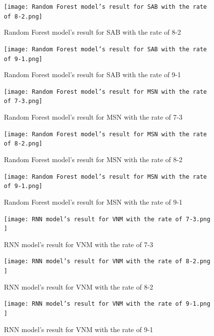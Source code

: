 \documentclass{ieeeojies}
\begin{document}
     \begin{figure}[H]
    \centering
    \begin{minipage}{0.23\textwidth}
    \centering
    \texttt{[image: Random Forest model’s result for SAB with the rate of 8-2.png]}
    \caption{Random Forest model’s result for SAB with the rate of 8-2}
    \end{minipage}
    \hfill
    \begin{minipage}{0.23\textwidth}
    \centering
    \texttt{[image: Random Forest model’s result for SAB with the rate of 9-1.png]}
    \caption{Random Forest model’s result for SAB with the rate of 9-1}
    \end{minipage}

    \begin{minipage}{0.23\textwidth}
    \centering
    \texttt{[image: Random Forest model’s result for MSN with the rate of 7-3.png]}
    \caption{Random Forest model’s result for MSN with the rate of 7-3}
    \end{minipage}
    \hfill
    \begin{minipage}{0.23\textwidth}
    \centering
    \texttt{[image: Random Forest model’s result for MSN with the rate of 8-2.png]}
    \caption{Random Forest model’s result for MSN with the rate of 8-2}
    \end{minipage}
   \end{figure}

    \begin{figure}[H]
    \centering
    \begin{minipage}{0.23\textwidth}
    \centering
    \texttt{[image: Random Forest model’s result for MSN with the rate of 9-1.png]}
    \caption{Random Forest model’s result for MSN with the rate of 9-1}
    \end{minipage}
    \begin{minipage}{0.23\textwidth}
    \centering
    \texttt{[image: RNN model’s result for VNM with the rate of 7-3.png ]}
    \caption{RNN model’s result for VNM with the rate of 7-3}
    \end{minipage}
    \end{figure}

    \begin{figure}[H]
    \begin{minipage}{0.23\textwidth}
    \centering
    \texttt{[image: RNN model’s result for VNM with the rate of 8-2.png ]}
    \caption{RNN model’s result for VNM with the rate of 8-2}
    \end{minipage}
    \begin{minipage}{0.23\textwidth}
    \centering
    \texttt{[image: RNN model’s result for VNM with the rate of 9-1.png ]}
    \caption{RNN model’s result for VNM with the rate of 9-1}
    \end{minipage}
    \end{figure}
    
\end{document}
